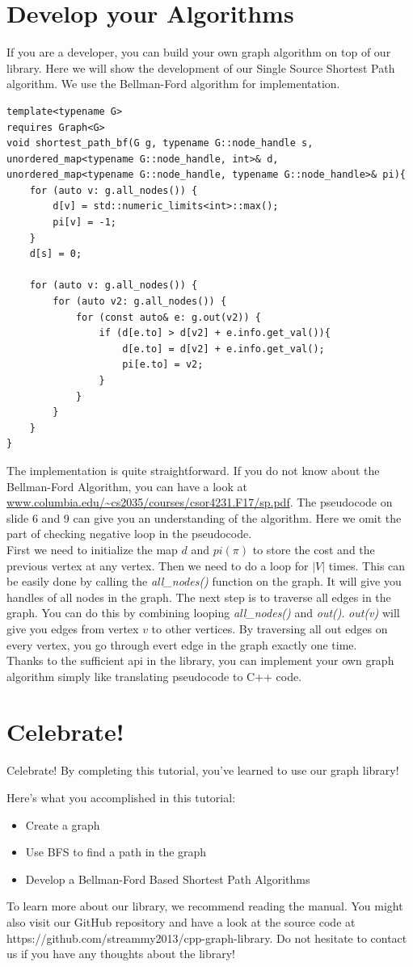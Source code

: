 \documentclass{article}
\begin{document}
    \section {Develop your Algorithms}
If you are a developer, you can build your own graph algorithm on top of our library. Here we will show the development of our Single Source Shortest Path algorithm. We use the Bellman-Ford algorithm for implementation.
\begin{lstlisting}
template<typename G>
requires Graph<G>
void shortest_path_bf(G g, typename G::node_handle s,
unordered_map<typename G::node_handle, int>& d,
unordered_map<typename G::node_handle, typename G::node_handle>& pi){
	for (auto v: g.all_nodes()) {
		d[v] = std::numeric_limits<int>::max();
		pi[v] = -1;
	}
	d[s] = 0;

	for (auto v: g.all_nodes()) {
		for (auto v2: g.all_nodes()) {
			for (const auto& e: g.out(v2)) {
				if (d[e.to] > d[v2] + e.info.get_val()){
					d[e.to] = d[v2] + e.info.get_val();
					pi[e.to] = v2;
				}
			}
		}
	}
}
\end{lstlisting}
The implementation is quite straightforward. If you do not know about the Bellman-Ford Algorithm, you can have a look at \url{www.columbia.edu/~cs2035/courses/csor4231.F17/sp.pdf}. The pseudocode on slide 6 and 9 can give you an understanding of the algorithm. Here we omit the part of checking negative loop in the pseudocode.
\\
First we need to initialize the map $d$ and $pi(\pi)$ to store the cost and the previous vertex at any vertex. Then we need to do a loop for $|V|$ times. This can be easily done by calling the \textit{all\_nodes()} function on the graph. It will give you handles of all nodes in the graph. The next step is to traverse all edges in the graph. You can do this by combining looping \textit{all\_nodes()} and \textit{out()}. \textit{out(v)} will give you edges from vertex $v$ to other vertices. By traversing all out edges on every vertex, you go through evert edge in the graph exactly one time.
\\
Thanks to the sufficient api in the library, you can implement your own graph algorithm simply like translating pseudocode to C++ code.

\section{Celebrate!}
Celebrate!
By completing this tutorial, you’ve learned to use our graph library!

Here’s what you accomplished in this tutorial:

    \begin{itemize}
	\item Create a graph
	\item Use BFS to find a path in the graph
	\item Develop a Bellman-Ford Based Shortest Path Algorithms
\end{itemize}

To learn more about our library, we recommend reading the manual. You might also visit our GitHub repository and have a look at the source code at https://github.com/streammy2013/cpp-graph-library. Do not hesitate to contact us if you have any thoughts about the library!
\end{document}
